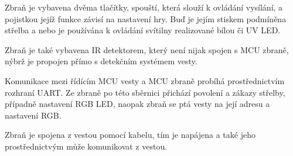 Zbraň je vybavena dvěma tlačítky, spouští, která slouží k ovládání vysílání, a pojistkou jejíž funkce závisí na nastavení hry. Buď je jejím stiskem podmíněna střelba a nebo je používána k ovládání svítilny realizované bílou či UV LED.

Zbraň je také vybavena IR detektorem, který není nijak spojen s MCU zbraně, nýbrž je propojen přímo s detekčním systémem vesty.

Komunikace mezi řídícím MCU vesty a MCU zbraně probíhá prostřednictvím rozhraní UART. Ze zbraně po této sběrnici přichází povolení a zákazy střelby, případně nastavení RGB LED, naopak zbraň se ptá vesty na její adresu a nastavení RGB.

Zbraň je spojena z vestou pomocí kabelu, tím je napájena a také jeho prostřednictvým může komunikovat z vestou.

